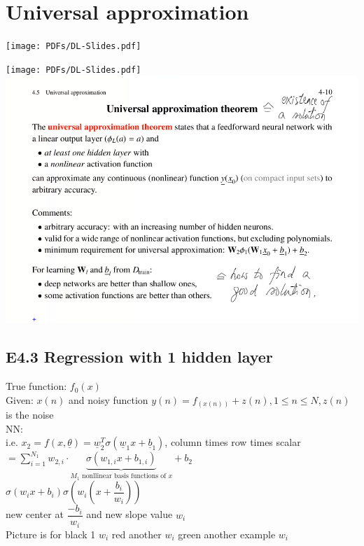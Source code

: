 \section{Universal approximation } 
\texttt{[image: PDFs/DL-Slides.pdf]}

\texttt{[image: PDFs/DL-Slides.pdf]}
\includegraphics[width=\linewidth]{Images/Slide410.png}

\subsection{E4.3 Regression with 1 hidden layer}
True function: $ f_0(x)   $\\
Given: $ x(n)  $ and noisy function $ y(n) = f_(x(n)) + z(n) , 1 \leq n \leq N  ,z(n)$ is the noise \\
NN: \\
i.e. $  x_2 = f(x, \underline{\theta}) = \underline{w}_2^T \sigma ( \underline{w}_1 x + \underline{b}_1 )  $, column times row times scalar \\
$ = \sum_{i=1}^{N_1} w_{2,i} \cdot \underbrace{\sigma ( w_{1,i} x + b_{1,i}) }_{M_1 \text{ nonllinear basis functions of }x} + b_2$ \\
$ \sigma ( w_i x + b_i ) \sigma (w_i ( x + \dfrac{b_i}{w_i})) $ \\
new center at $ \dfrac{-b_i}{w_i} $ and new slope value $ w_i $ \\
Picture is for black 1 $ w_i $ red another $ w_i $ green another example $ w_i $\\
